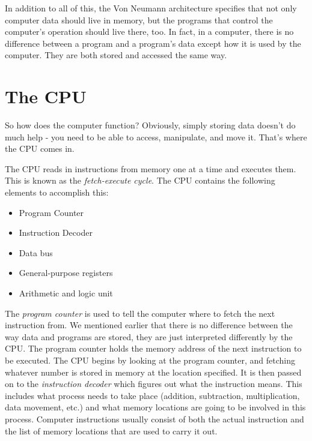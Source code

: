 In addition to all of this, the Von Neumann architecture specifies that
not only computer data should live in memory, but the programs that 
control the computer's operation should live there, too.  In fact, in 
a computer, there is no difference between a program and a program's
data except how it is used by the computer.  They are both stored and
accessed the same way.

\section{The CPU}

So how does the computer function?  Obviously, simply storing data doesn't
do much help - you need to be able to access, manipulate, and move it.  That's where
the CPU comes in.

The CPU reads in instructions from memory one at a time and executes them.
This is known as the \emph{fetch-execute cycle}.  The CPU
contains the following elements to accomplish this:

\begin{itemize}\item Program Counter 
\item Instruction Decoder 
\item Data bus 
\item General-purpose registers 
\item Arithmetic and logic unit 
\end{itemize}

The \emph{program counter} is used to tell the computer where
to fetch the next instruction from.  We mentioned earlier that there is no
difference between the way data and programs are stored, they are just 
interpreted differently by the CPU.  The program counter holds the 
memory address of the next instruction
to be executed.  The CPU begins by looking at the program counter, and fetching
whatever number is stored in memory at the location specified.  It is then
passed on to the \emph{instruction decoder} which figures
out what the instruction means.  This includes what process needs to take
place (addition, subtraction, multiplication, data movement, etc.) and 
what memory locations are going to be involved in this process.  Computer
instructions usually consist of both the actual instruction and the list
of memory locations that are used to carry it out.

